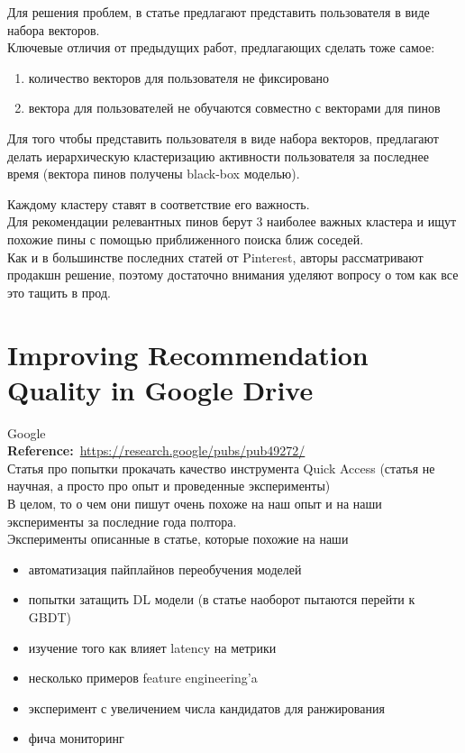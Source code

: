 \begin{bibunit}[plainnat]
Для решения проблем, в статье предлагают представить пользователя в виде набора векторов. \\

Ключевые отличия от предыдущих работ, предлагающих сделать тоже самое:
\begin{enumerate}
    \item количество векторов для пользователя не фиксировано
    \item вектора для пользователей не обучаются совместно с векторами для пинов
\end{enumerate}

Для того чтобы представить пользователя в виде набора векторов, предлагают делать иерархическую кластеризацию активности пользователя за последнее время (вектора пинов получены black-box моделью).

Каждому кластеру ставят в соответствие его важность.  \\

Для рекомендации релевантных пинов берут 3 наиболее важных кластера и ищут похожие пины с помощью приближенного поиска ближ соседей. \\

Как и в большинстве последних статей от Pinterest, авторы рассматривают продакшн решение, поэтому достаточно внимания уделяют вопросу о том как все это тащить в прод.

\section*{Improving Recommendation Quality in Google Drive}

Google \\

\textbf{Reference:}~\url{https://research.google/pubs/pub49272/} \\

Статья про попытки прокачать качество инструмента Quick Access (статья не научная, а просто про опыт и проведенные эксперименты) \\

В целом, то о чем они пишут очень похоже на наш опыт и на наши эксперименты за последние года полтора. \\

Эксперименты описанные в статье, которые похожие на наши
\begin{itemize}
    \item автоматизация пайплайнов переобучения моделей
    \item попытки затащить DL модели (в статье наоборот пытаются перейти к GBDT)
    \item изучение того как влияет latency на метрики
    \item несколько примеров feature engineering'a 
    \item эксперимент с увеличением числа кандидатов для ранжирования
    \item фича мониторинг
\end{itemize}


\end{bibunit}
